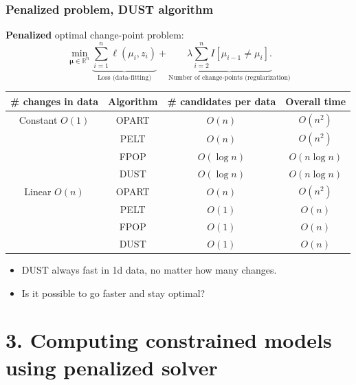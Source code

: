 \documentclass{beamer}
\newcommand{\algo}[1]{\textcolor{#1}{#1}}
\newcommand{\RR}{\mathbb R}
\begin{document}
\begin{frame}
  \frametitle{Penalized problem, DUST algorithm}
  \textbf{Penalized} optimal change-point problem:
$$
\min_{
  \mathbf \mu\in\RR^{n}
}
\underbrace{\sum_{i=1}^{n} \ell( \mu_i,  z_i)}_{\text{Loss (data-fitting)}} + \underbrace{\lambda\sum_{i=2}^n I[\mu_{i-1}\neq \mu_i].}_{\text{Number of change-points (regularization)}}
$$
\begin{tabular}{cccc}
  \# changes in data & Algorithm & \# candidates per data & Overall time \\
  \hline
  Constant $O(1)$ & \algo{OPART} &  $O(n)$ & $O(n^2)$\\
                     & \algo{PELT} &  $O(n)$ & $O(n^2)$\\
                     & \algo{FPOP} &  \textcolor{FPOP}{$O(\log n)$} & \textcolor{FPOP}{$O(n\log n)$}\\
                     & \algo{DUST} &  \textcolor{DUST}{$O(\log n)$} & \textcolor{DUST}{$O(n\log n)$}\\
  \hline
  Linear $O(n)$ & \algo{OPART} &  $O(n)$ & $O(n^2)$ \\
   & \algo{PELT} &  \textcolor{PELT}{$O(1)$} & \textcolor{PELT}{$O(n)$} \\
   & \algo{FPOP} &  \textcolor{FPOP}{$O(1)$} & \textcolor{FPOP}{$O(n)$} \\
   & \algo{DUST} &  \textcolor{DUST}{$O(1)$} & \textcolor{DUST}{$O(n)$} \\
\end{tabular}

\begin{itemize}
\item DUST always fast in 1d data, no matter how many changes.
\item Is it possible to go faster and stay optimal?
\end{itemize}
\end{frame}

\section{3. Computing constrained models using penalized solver} 
 
\end{document}
